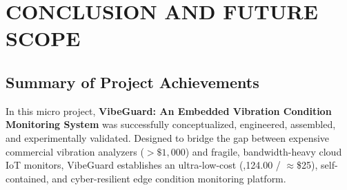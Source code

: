\chapter{CONCLUSION AND FUTURE SCOPE}
\label{ch:conclusion_future}

\section{Summary of Project Achievements}
In this micro project, \textbf{VibeGuard: An Embedded Vibration Condition Monitoring System} was successfully conceptualized, engineered, assembled, and experimentally validated. Designed to bridge the gap between expensive commercial vibration analyzers ($>\$1,000$) and fragile, bandwidth-heavy cloud IoT monitors, VibeGuard establishes an ultra-low-cost (,124.00 / $\approx$\$25), self-contained, and cyber-resilient edge condition monitoring platform.

